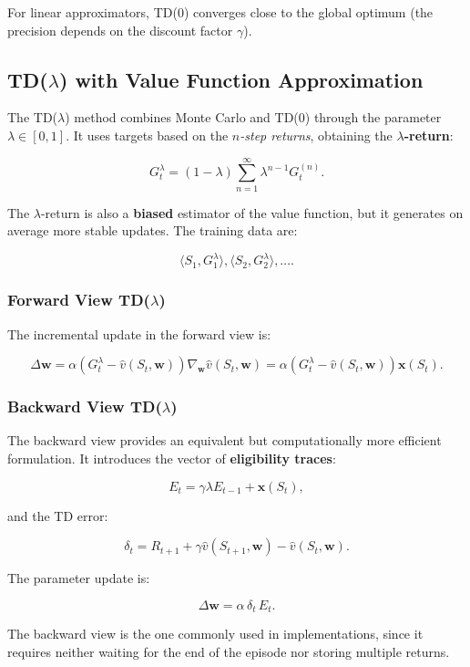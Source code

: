 For linear approximators, TD(0) converges close to the global optimum (the precision depends on the discount factor $\gamma$).

\subsection{TD($\lambda$) with Value Function Approximation}

The TD($\lambda$) method combines Monte Carlo and TD(0) through the parameter $\lambda \in [0,1]$.
It uses targets based on the \textit{$n$-step returns}, obtaining the \textbf{$\lambda$-return}:

\[
G_t^\lambda = (1-\lambda)
\sum_{n=1}^{\infty} \lambda^{n-1} G_t^{(n)}.
\]

The $\lambda$-return is also a \textbf{biased} estimator of the value function, but it generates on average more stable updates.
The training data are:

\[
\langle S_1, G_1^\lambda \rangle, \langle S_2, G_2^\lambda \rangle, \dots.
\]

\subsubsection{Forward View TD($\lambda$)}

The incremental update in the forward view is:

\[
\Delta \mathbf{w}
=
\alpha \left( G_t^\lambda - \hat{v}(S_t,\mathbf{w}) \right)
\nabla_{\mathbf{w}} \hat{v}(S_t,\mathbf{w})
=
\alpha \left( G_t^\lambda - \hat{v}(S_t,\mathbf{w}) \right)
\mathbf{x}(S_t).
\]

\subsubsection{Backward View TD($\lambda$)}

The backward view provides an equivalent but computationally more efficient formulation.
It introduces the vector of \textbf{eligibility traces}:

\[
E_t = \gamma \lambda E_{t-1} + \mathbf{x}(S_t),
\]

and the TD error:

\[
\delta_t = R_{t+1} + \gamma \hat{v}(S_{t+1},\mathbf{w}) - \hat{v}(S_t,\mathbf{w}).
\]

The parameter update is:

\[
\Delta \mathbf{w}
=
\alpha \, \delta_t \, E_t.
\]

The backward view is the one commonly used in implementations, since it requires neither waiting for the end of the episode nor storing multiple returns.
